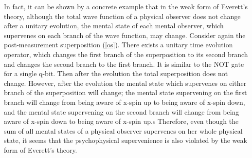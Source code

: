 In fact, it can be shown by a concrete example that in the weak form of Everett's theory, although the total wave function of a physical observer does not change after a unitary evolution, the mental state of each mental observer, which supervenes on each branch of the wave function, may change. 
Consider again the post-measurement superposition (\ref{os}). 
There exists a unitary time evolution operator, which changes the first branch of the superposition to its second branch and changes the second branch to the first branch. It is similar to the NOT gate for a single q-bit. 
Then after the evolution the total superposition does not change. 
However, after the evolution the mental state which supervenes on either branch of the superposition will change; the mental state supervening on the first branch will change from being aware of x-spin up to being aware of x-spin down, and  the mental state supervening on the second branch will change from being aware of x-spin down to being aware of x-spin up.s
Therefore,  even though the sum of all mental states of a physical observer supervenes on her whole physical state, it seems that the psychophysical supervenience is also violated by the weak form of Everett's theory. 



